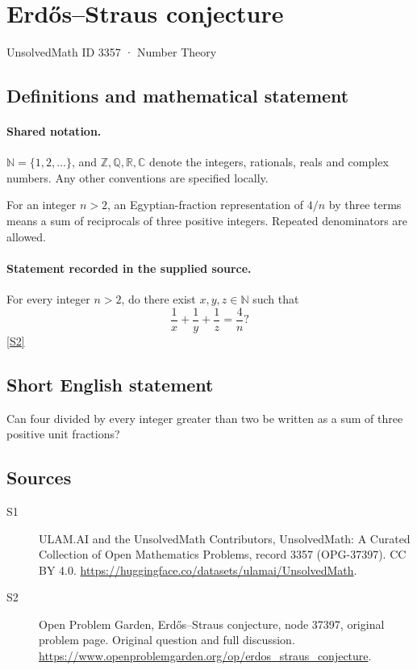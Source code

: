 \documentclass[11pt]{article}
\newcommand{\sref}[2]{\hyperlink{source:#1:#2}{[S#2]}}
\begin{document}
\setcounter{section}{3356}
\section{Erdős–Straus conjecture}\label{3357}
{\small\sffamily UnsolvedMath ID 3357 · Number Theory}
\subsection{Definitions and mathematical statement}

\paragraph{Shared notation.}$\mathbb N=\{1,2,\ldots\}$, and $\mathbb Z,\mathbb Q,\mathbb R,\mathbb C$ denote the integers, rationals, reals and complex numbers. Any other conventions are specified locally.


For an integer $n>2$, an Egyptian-fraction representation of $4/n$ by three terms means a sum of reciprocals of three positive integers. Repeated denominators are allowed.
\paragraph{Statement recorded in the supplied source.}
For every integer $n>2$, do there exist $x,y,z\in\mathbb N$ such that\[ \frac1x+\frac1y+\frac1z=\frac4n? \] \sref{3357}{2}
\subsection{Short English statement}
Can four divided by every integer greater than two be written as a sum of three positive unit fractions?
\subsection{Sources}
\begin{description}
\item[\hypertarget{source:3357:1}{S1}] ULAM.AI and the UnsolvedMath Contributors, UnsolvedMath: A Curated Collection of Open Mathematics Problems, record 3357 (OPG-37397). CC BY 4.0. \url{https://huggingface.co/datasets/ulamai/UnsolvedMath}.
\item[\hypertarget{source:3357:2}{S2}] Open Problem Garden, Erdős–Straus conjecture, node 37397, original problem page. Original question and full discussion. \url{https://www.openproblemgarden.org/op/erdos_straus_conjecture}.

\end{description}
\label{end:3357}
\end{document}

